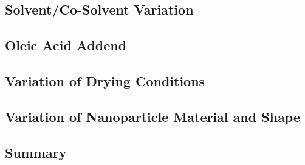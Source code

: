\documentclass[\main/dresen_thesis.tex]{subfiles}
\renewcommand{\thisPath}{\main/chapters/monolayers/preparationMonolayers}
\begin{document}

    \subsection{Solvent/Co-Solvent Variation}
      
      \FloatBarrier

    \subsection{Oleic Acid Addend}
      
      \FloatBarrier

    \subsection{Variation of Drying Conditions}
      
      \FloatBarrier

    \subsection{Variation of Nanoparticle Material and Shape}
      
      \FloatBarrier

    \subsection{Summary}
      
      \FloatBarrier
\end{document}
